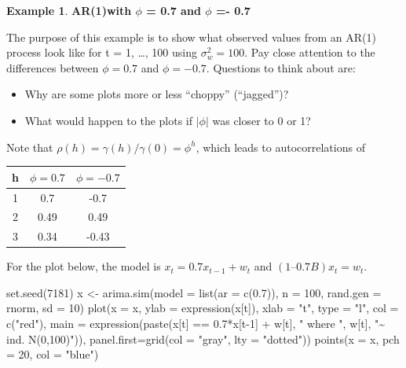\documentclass[
]{book}
\newenvironment{Shaded}{\begin{snugshade}}{\end{snugshade}}
\newcommand{\AttributeTok}[1]{\textcolor[rgb]{0.77,0.63,0.00}{#1}}
\newcommand{\DecValTok}[1]{\textcolor[rgb]{0.00,0.00,0.81}{#1}}
\newcommand{\FloatTok}[1]{\textcolor[rgb]{0.00,0.00,0.81}{#1}}
\newcommand{\FunctionTok}[1]{\textcolor[rgb]{0.00,0.00,0.00}{#1}}
\newcommand{\NormalTok}[1]{#1}
\newcommand{\OtherTok}[1]{\textcolor[rgb]{0.56,0.35,0.01}{#1}}
\newcommand{\SpecialCharTok}[1]{\textcolor[rgb]{0.00,0.00,0.00}{#1}}
\newcommand{\StringTok}[1]{\textcolor[rgb]{0.31,0.60,0.02}{#1}}
\providecommand{\tightlist}{%
  \setlength{\itemsep}{0pt}\setlength{\parskip}{0pt}}
\theoremstyle{definition}
\theoremstyle{definition}
\newtheorem{example}{Example}[chapter]
\theoremstyle{definition}
\theoremstyle{definition}
\theoremstyle{remark}
\begin{document}
\begin{example}
\textbf{AR(1)with \(\phi\) = 0.7 and \(\phi\) =- 0.7}

The purpose of this example is to show what observed values from an AR(1) process look like for t = 1, \ldots, 100 using \(\sigma_w^2 = 100\). Pay close attention to the differences between \(\phi = 0.7\) and \(\phi = -0.7\). Questions to think about are:

\begin{itemize}
\tightlist
\item
  Why are some plots more or less ``choppy'' (``jagged'')?\\
\item
  What would happen to the plots if \(|\phi|\) was closer to 0 or 1?
\end{itemize}

Note that \(\rho(h) = \gamma(h)/\gamma(0) = \phi^h\), which leads to autocorrelations of

\begin{longtable}[]{@{}ccc@{}}
\toprule()
h & \(\phi=0.7\) & \(\phi=-0.7\) \\
\midrule()
\endhead
1 & 0.7 & -0.7 \\
2 & 0.49 & 0.49 \\
3 & 0.34 & -0.43 \\
\bottomrule()
\end{longtable}

For the plot below, the model is \(x_t = 0.7x_{t-1} + w_t\) and
\((1 – 0.7B)x_t = w_t.\)

\begin{Shaded}
\begin{Highlighting}[]
\FunctionTok{set.seed}\NormalTok{(}\DecValTok{7181}\NormalTok{)}
\NormalTok{x }\OtherTok{\textless{}{-}} \FunctionTok{arima.sim}\NormalTok{(}\AttributeTok{model =} \FunctionTok{list}\NormalTok{(}\AttributeTok{ar =} \FunctionTok{c}\NormalTok{(}\FloatTok{0.7}\NormalTok{)), }\AttributeTok{n =} \DecValTok{100}\NormalTok{, rand.gen }
  \OtherTok{=}\NormalTok{ rnorm, }\AttributeTok{sd =} \DecValTok{10}\NormalTok{)}
\FunctionTok{plot}\NormalTok{(}\AttributeTok{x =}\NormalTok{ x, }\AttributeTok{ylab =} \FunctionTok{expression}\NormalTok{(x[t]), }\AttributeTok{xlab =} \StringTok{"t"}\NormalTok{, }\AttributeTok{type =} 
  \StringTok{"l"}\NormalTok{, }\AttributeTok{col =} \FunctionTok{c}\NormalTok{(}\StringTok{"red"}\NormalTok{), }\AttributeTok{main =} 
  \FunctionTok{expression}\NormalTok{(}\FunctionTok{paste}\NormalTok{(x[t] }\SpecialCharTok{==} \FloatTok{0.7}\SpecialCharTok{*}\NormalTok{x[t}\DecValTok{{-}1}\NormalTok{] }\SpecialCharTok{+}\NormalTok{ w[t], }\StringTok{" where "}\NormalTok{, }
\NormalTok{  w[t], }\StringTok{"\textasciitilde{} ind. N(0,100)"}\NormalTok{)), }\AttributeTok{panel.first=}\FunctionTok{grid}\NormalTok{(}\AttributeTok{col =} 
  \StringTok{"gray"}\NormalTok{, }\AttributeTok{lty =} \StringTok{"dotted"}\NormalTok{))}
\FunctionTok{points}\NormalTok{(}\AttributeTok{x =}\NormalTok{ x, }\AttributeTok{pch =} \DecValTok{20}\NormalTok{, }\AttributeTok{col =} \StringTok{"blue"}\NormalTok{)}
\end{Highlighting}
\end{Shaded}


\end{example}
\end{document}
